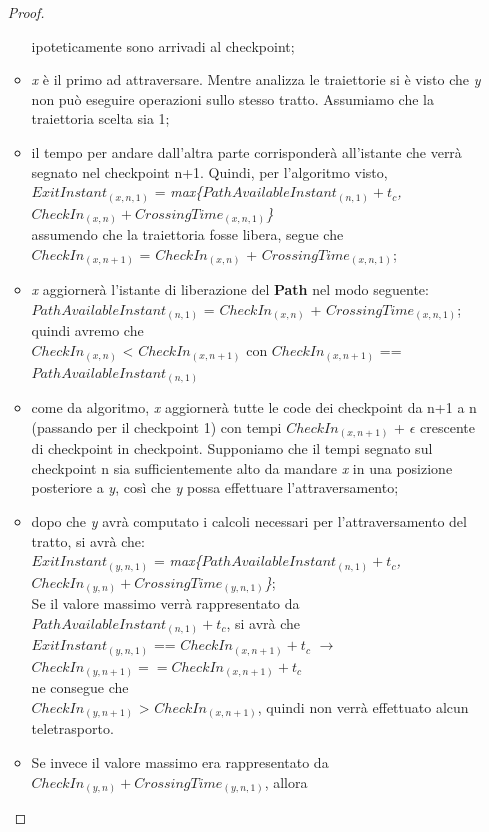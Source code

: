 \begin{itemize}
\begin{proof}
\begin{itemize}
ipoteticamente sono arrivadi al checkpoint;
\item \emph{x} è il primo ad attraversare. Mentre analizza le traiettorie si è visto che \emph{y} non può eseguire operazioni
sullo stesso tratto. Assumiamo che la traiettoria scelta sia 1;
\item il tempo per andare dall'altra parte corrisponderà all'istante che verrà segnato nel checkpoint 
n+1. Quindi, per l'algoritmo visto, \\
$ExitInstant_{(x,n,1)}$ = \emph{max\{$PathAvailableInstant_{(n,1)}+t_c$,$CheckIn_{(x,n)}+CrossingTime_{(x,n,1)}$\}}\\
assumendo che la traiettoria fosse libera, segue che\\
$CheckIn_{(x,n+1)}$ = $CheckIn_{(x,n)}$ + $CrossingTime_{(x,n,1)}$;
\item \emph{x} aggiornerà l'istante di liberazione del \textbf{Path} nel modo seguente:
$PathAvailableInstant_{(n,1)}$ = $CheckIn_{(x,n)}$ + $CrossingTime_{(x,n,1)}$;\\
quindi avremo che\\
$CheckIn_{(x,n)}$ < $CheckIn_{(x,n+1)}$ con $CheckIn_{(x,n+1)}$ == $PathAvailableInstant_{(n,1)}$
\item come da algoritmo, \emph{x} aggiornerà tutte le code dei checkpoint da n+1 a n (passando per il checkpoint 1) con tempi $CheckIn_{(x,n+1)}$ + $\epsilon$ 
crescente di checkpoint in checkpoint. Supponiamo che il tempi segnato sul checkpoint n sia sufficientemente alto da mandare \emph{x}
in una posizione posteriore a \emph{y}, così che \emph{y} possa effettuare l'attraversamento;
\item dopo che \emph{y} avrà computato i calcoli necessari per l'attraversamento del tratto, si avrà che:\\
$ExitInstant_{(y,n,1)}$ = \emph{max\{$PathAvailableInstant_{(n,1)}+t_c$,$CheckIn_{(y,n)}+CrossingTime_{(y,n,1)}$\}};\\
Se il valore massimo verrà rappresentato da $PathAvailableInstant_{(n,1)}+t_c$, si avrà che \\
$ExitInstant_{(y,n,1)}$ == $CheckIn_{(x,n+1)}+t_c$ $\rightarrow$ $CheckIn_{(y,n+1)}==CheckIn_{(x,n+1)}+t_c$\\
ne consegue che\\
$CheckIn_{(y,n+1)}$ > $CheckIn_{(x,n+1)}$, quindi non verrà effettuato alcun teletrasporto.
\item Se invece il valore massimo era rappresentato da\\ 
$CheckIn_{(y,n)}+CrossingTime_{(y,n,1)}$, allora\\ 

\end{itemize}
\end{proof}
\end{itemize}
